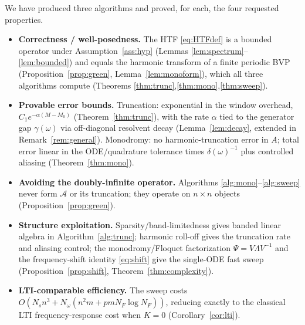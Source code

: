 \documentclass{amsart}
\theoremstyle{definition}
\newcommand{\Acal}{\mathcal{A}}
\begin{document}
We have produced three algorithms and proved, for each, the four requested
properties.
\begin{itemize}
\item \textbf{Correctness / well-posedness.} The HTF \eqref{eq:HTFdef} is a
bounded operator under Assumption~\ref{ass:hyp} (Lemmas
\ref{lem:spectrum}--\ref{lem:bounded}) and equals the harmonic transform of a
finite periodic BVP (Proposition~\ref{prop:green}, Lemma~\ref{lem:monoform}),
which all three algorithms compute (Theorems
\ref{thm:trunc},\ref{thm:mono},\ref{thm:sweep}).
\item \textbf{Provable error bounds.} Truncation: exponential in the window
overhead, $C_1 e^{-\alpha(M-M_0)}$ (Theorem~\ref{thm:trunc}), with the rate
$\alpha$ tied to the generator gap $\gamma(\omega)$ via off-diagonal resolvent
decay (Lemma~\ref{lem:decay}, extended in Remark~\ref{rem:general}). Monodromy:
no harmonic-truncation error in $A$; total error linear in the ODE/quadrature
tolerance times $\delta(\omega)^{-1}$ plus controlled aliasing
(Theorem~\ref{thm:mono}).
\item \textbf{Avoiding the doubly-infinite operator.} Algorithms
\ref{alg:mono}--\ref{alg:sweep} never form $\Acal$ or its truncation; they
operate on $n\times n$ objects (Proposition~\ref{prop:green}).
\item \textbf{Structure exploitation.} Sparsity/band-limitedness gives banded
linear algebra in Algorithm~\ref{alg:trunc}; harmonic roll-off gives the
truncation rate and aliasing control; the monodromy/Floquet factorization
$\Psi=V\Lambda V^{-1}$ and the frequency-shift identity \eqref{eq:shift} give the
single-ODE fast sweep (Proposition~\ref{prop:shift},
Theorem~\ref{thm:complexity}).
\item \textbf{LTI-comparable efficiency.} The sweep costs
$O(N_s n^3 + N_\omega(n^2m + pmN_F\log N_F))$, reducing exactly to the classical
LTI frequency-response cost when $K=0$ (Corollary~\ref{cor:lti}).
\end{itemize}
\end{document}
